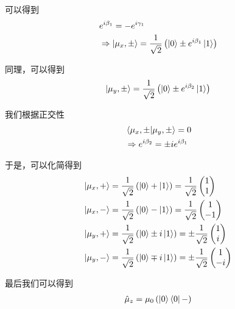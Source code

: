 \documentclass{article}
\begin{document}
可以得到
\begin{align*}
	 & e^{i\beta_1}=-e^{i\gamma_1}                                                               \\
	 & \Rightarrow \ket{\mu_x,\pm}=\frac{1}{\sqrt{2}}\left(\ket{0}\pm e^{i\beta_1}\ket{1}\right)
\end{align*}

同理，可以得到
\begin{align*}
	\ket{\mu_y,\pm}=\frac{1}{\sqrt{2}}\left(\ket{0}\pm e^{i\beta_2}\ket{1}\right)
\end{align*}

我们根据正交性
\begin{align*}
	 & \braket{\mu_x,\pm}{\mu_y,\pm}=0            \\
	 & \Rightarrow e^{i\beta_2}=\pm ie^{i\beta_1}
\end{align*}

于是，可以化简得到
\begin{align*}
	\ket{\mu_x,+} & =\frac{1}{\sqrt{2}}\left(\ket{0}+\ket{1}\right)=\frac{1}{\sqrt{2}}
	\begin{pmatrix}
		1 \\
		1
	\end{pmatrix}                                                                             \\
	\ket{\mu_x,-} & =\frac{1}{\sqrt{2}}\left(\ket{0}-\ket{1}\right)=\frac{1}{\sqrt{2}}
	\begin{pmatrix}
		1 \\
		-1
	\end{pmatrix}                                                                             \\
	\ket{\mu_y,+} & =\frac{1}{\sqrt{2}}\left(\ket{0}\pm i\ket{1}\right)=\pm\frac{1}{\sqrt{2}}
	\begin{pmatrix}
		1 \\
		i
	\end{pmatrix}                                                                             \\
	\ket{\mu_y,-} & =\frac{1}{\sqrt{2}}\left(\ket{0}\mp  i\ket{1}\right)=\pm\frac{1}{\sqrt{2}}
	\begin{pmatrix}
		1 \\
		-i
	\end{pmatrix}                                                                             \\
\end{align*}

最后我们可以得到
\begin{align*}
	\hat{\mu}_z=\mu_0\left(\ket{0}\bra{0}-\right)
\end{align*}
\end{document}
